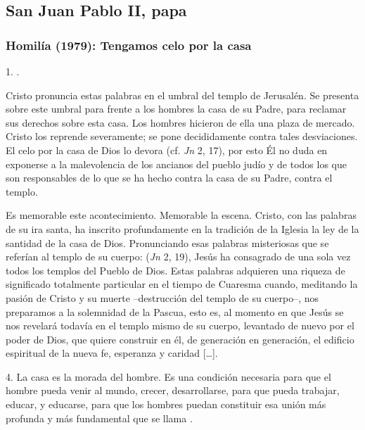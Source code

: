 \subsection{San Juan Pablo II, papa}

\subsubsection{Homilía (1979): Tengamos celo por la casa}


\begin{body}
1. .

 Cristo pronuncia estas palabras en el umbral del templo de Jerusalén. Se presenta sobre este umbral para  frente a los hombres la casa de su Padre, para reclamar sus derechos sobre esta casa. Los hombres hicieron de ella una plaza de mercado. Cristo los reprende severamente; se pone decididamente contra tales desviaciones. El celo por la casa de Dios lo devora (cf. \textit{Jn} 2, 17), por esto Él no duda en exponerse a la malevolencia de los ancianos del pueblo judío y de todos los que son responsables de lo que se ha hecho contra la casa de su Padre, contra el templo.

Es memorable este acontecimiento. Memorable la escena. Cristo, con las palabras de su ira santa, ha inscrito profundamente en la tradición de la Iglesia la ley de la santidad de la casa de Dios. Pronunciando esas palabras misteriosas que se referían al templo de su cuerpo:  (\textit{Jn} 2, 19), Jesús ha consagrado de una sola vez todos los templos del Pueblo de Dios. Estas palabras adquieren una riqueza de significado totalmente particular en el tiempo de Cuaresma cuando, meditando la pasión de Cristo y su muerte –destrucción del templo de su cuerpo–, nos preparamos a la solemnidad de la Pascua, esto es, al momento en que Jesús se nos revelará todavía en el templo mismo de su cuerpo, levantado de nuevo por el poder de Dios, que quiere construir en él, de generación en generación, el edificio espiritual de la nueva fe, esperanza y caridad [\ldots].

4. La casa es la morada del hombre. Es una condición necesaria para que el hombre pueda venir al mundo, crecer, desarrollarse, para que pueda trabajar, educar, y educarse, para que los hombres puedan constituir esa unión más profunda y más fundamental que se llama .


\end{body}

